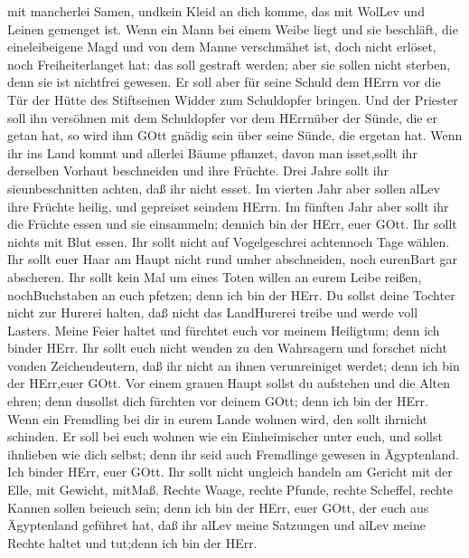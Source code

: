 mit mancherlei Samen, undkein Kleid an dich komme, das mit WolLev und
Leinen gemenget ist.  Wenn ein Mann bei einem Weibe liegt
und sie beschläft, die eineleibeigene Magd und von dem Manne verschmähet
ist, doch nicht erlöset, noch Freiheiterlanget hat: das soll gestraft
werden; aber sie sollen nicht sterben, denn sie ist nichtfrei gewesen.
 Er soll aber für seine Schuld dem HErrn vor die Tür der
Hütte des Stiftseinen Widder zum Schuldopfer bringen.  Und
der Priester soll ihn versöhnen mit dem Schuldopfer vor dem HErrnüber
der Sünde, die er getan hat, so wird ihm GOtt gnädig sein über seine
Sünde, die ergetan hat.  Wenn ihr ins Land kommt und
allerlei Bäume pflanzet, davon man isset,sollt ihr derselben Vorhaut
beschneiden und ihre Früchte. Drei Jahre sollt ihr sieunbeschnitten
achten, daß ihr nicht esset.  Im vierten Jahr aber sollen
alLev ihre Früchte heilig, und gepreiset seindem HErrn.  Im
fünften Jahr aber sollt ihr die Früchte essen und sie einsammeln;
dennich bin der HErr, euer GOtt.  Ihr sollt nichts mit Blut
essen. Ihr sollt nicht auf Vogelgeschrei achtennoch Tage wählen.
 Ihr sollt euer Haar am Haupt nicht rund umher abschneiden,
noch eurenBart gar abscheren.  Ihr sollt kein Mal um eines
Toten willen an eurem Leibe reißen, nochBuchstaben an euch pfetzen; denn
ich bin der HErr.  Du sollst deine Tochter nicht zur
Hurerei halten, daß nicht das LandHurerei treibe und werde voll Lasters.
 Meine Feier haltet und fürchtet euch vor meinem Heiligtum;
denn ich binder HErr.  Ihr sollt euch nicht wenden zu den
Wahrsagern und forschet nicht vonden Zeichendeutern, daß ihr nicht an
ihnen verunreiniget werdet; denn ich bin der HErr,euer GOtt.
 Vor einem grauen Haupt sollst du aufstehen und die Alten
ehren; denn dusollst dich fürchten vor deinem GOtt; denn ich bin der
HErr.  Wenn ein Fremdling bei dir in eurem Lande wohnen
wird, den sollt ihrnicht schinden.  Er soll bei euch wohnen
wie ein Einheimischer unter euch, und sollst ihnlieben wie dich selbst;
denn ihr seid auch Fremdlinge gewesen in Ägyptenland. Ich binder HErr,
euer GOtt.  Ihr sollt nicht ungleich handeln am Gericht mit
der Elle, mit Gewicht, mitMaß.  Rechte Waage, rechte
Pfunde, rechte Scheffel, rechte Kannen sollen beieuch sein; denn ich bin
der HErr, euer GOtt, der euch aus Ägyptenland geführet hat,
 daß ihr alLev meine Satzungen und alLev meine Rechte
haltet und tut;denn ich bin der HErr.

